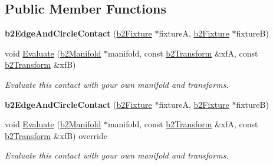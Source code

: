 \subsection*{Public Member Functions}
\begin{DoxyCompactItemize}
\item 
\mbox{\label{classb2EdgeAndCircleContact_a9de91d6afe4d2407f679b2ccaded9c02}} 
{\bfseries b2\+Edge\+And\+Circle\+Contact} (\hyperlink{classb2Fixture}{b2\+Fixture} $\ast$fixtureA, \hyperlink{classb2Fixture}{b2\+Fixture} $\ast$fixtureB)
\item 
\mbox{\label{classb2EdgeAndCircleContact_a8f083c4c7c7da83eae38975164fd1452}} 
void \hyperlink{classb2EdgeAndCircleContact_a8f083c4c7c7da83eae38975164fd1452}{Evaluate} (\hyperlink{structb2Manifold}{b2\+Manifold} $\ast$manifold, const \hyperlink{structb2Transform}{b2\+Transform} \&xfA, const \hyperlink{structb2Transform}{b2\+Transform} \&xfB)
\begin{DoxyCompactList}\small\item\em Evaluate this contact with your own manifold and transforms. \end{DoxyCompactList}\item 
\mbox{\label{classb2EdgeAndCircleContact_a9de91d6afe4d2407f679b2ccaded9c02}} 
{\bfseries b2\+Edge\+And\+Circle\+Contact} (\hyperlink{classb2Fixture}{b2\+Fixture} $\ast$fixtureA, \hyperlink{classb2Fixture}{b2\+Fixture} $\ast$fixtureB)
\item 
\mbox{\label{classb2EdgeAndCircleContact_aec021f688dcf2b5a2c483edde476d4b6}} 
void \hyperlink{classb2EdgeAndCircleContact_aec021f688dcf2b5a2c483edde476d4b6}{Evaluate} (\hyperlink{structb2Manifold}{b2\+Manifold} $\ast$manifold, const \hyperlink{structb2Transform}{b2\+Transform} \&xfA, const \hyperlink{structb2Transform}{b2\+Transform} \&xfB) override
\begin{DoxyCompactList}\small\item\em Evaluate this contact with your own manifold and transforms. \end{DoxyCompactList}\end{DoxyCompactItemize}
